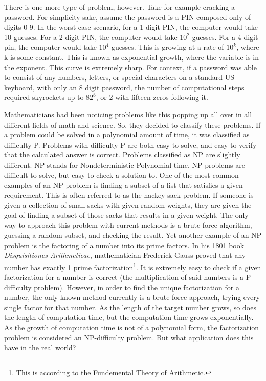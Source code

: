 \documentclass[12pt]{article}
\begin{document}
\begin{flushleft}
 There is one more type of problem, however. Take for example cracking a password. For simplicity sake, assume the password is a PIN composed only of digits 0-9. In the worst case scenario, for a 1 digit PIN, the computer would take 10 guesses. For a 2 digit PIN, the computer would take $10^2$ guesses. For a 4 digit pin, the computer would take $10^4$ guesses. This is growing at a rate of $10^k$, where k is some constant. This is known as exponential growth, where the variable is in the exponent. This curve is extremely sharp. For context, if a password was able to consist of any numbers, letters, or special characters on a standard US keyboard, with only an 8 digit password, the number of computational steps required skyrockets up to $82^8$, or 2 with fifteen zeros following it. 


Mathematicians had been noticing problems like this popping up all over in all different fields of math and science. So, they decided to classify these problems. If a problem could be solved in a polynomial amount of time, it was classified as difficulty P. Problems with difficulty P are both easy to solve, and easy to verify that the calculated answer is correct. 
Problems classified as NP are slightly different. NP stands for Nondeterministic Polynomial time. NP problems are difficult to solve, but easy to check a solution to. One of the most common examples of an NP problem is finding a subset of a list that satisfies a given requirement. This is often referred to as the hackey sack problem. If someone is given a collection of small sacks with given random weights, they are given the goal of finding a subset of those sacks that results in a given weight. The only way to approach this problem with current methods is a brute force algorithm, guessing a random subset, and checking the result. Yet another example of an NP problem is the factoring of a number into its prime factors. In his 1801 book \textit{Disquisitiones Arithmeticae}, mathematician Frederick Gauss proved that any number has exactly 1 prime factorization\footnote{This is according to the Fundemental Theory of Arithmetic.}. It is extremely easy to check if a given factorization for a number is correct (the multiplication of said numbers is a P-difficulty problem). However, in order to find the unique factorization for a number, the only known method currently is a brute force approach, trying every single factor for that number. As the length of the target number grows, so does the length of computation time, but the computation time grows exponentially. As the growth of computation time is not of a polynomial form, the factorization problem is considered an NP-difficulty problem. But what application does this have in the real world?



\end{flushleft}
\end{document}
